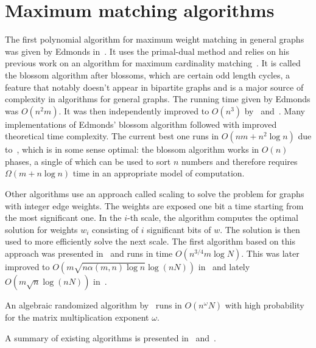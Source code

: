 \section{Maximum matching algorithms}

The first polynomial algorithm for maximum weight matching in general graphs was given by Edmonds in~\cite{edmonds1965maximum}. It uses the primal-dual method and relies on his previous work on an algorithm for maximum cardinality matching~\cite{edmonds1965paths}. It is called the blossom algorithm after blossoms, which are certain odd length cycles, a feature that notably doesn't appear in bipartite graphs and is a major source of complexity in algorithms for general graphs. The running time given by Edmonds was $O(n^2m)$. It was then independently improved to $O(n^3)$ by~\cite{lawler2001combinatorial} and~\cite{gabow1974implementation}. Many implementations of Edmonds' blossom algorithm followed with improved theoretical time complexity. The current best one runs in $O(nm + n^2 \log n)$ due to~\cite{gabow1990data}, which is in some sense optimal: the blossom algorithm works in $O(n)$ phases, a single of which can be used to sort $n$ numbers and therefore requires $\Omega(m + n \log n)$ time in an appropriate model of computation. 

Other algorithms use an approach called scaling to solve the problem for graphs with integer edge weights. The weights are exposed one bit a time starting from the most significant one. In the $i$-th scale, the algorithm computes the optimal solution for weights $w_i$ consisting of $i$ significant bits of $w$. The solution is then used to more efficiently solve the next scale. The first algorithm based on this approach was presented in~\cite{gabow1984efficient} and runs in time $O(n^{3/4}m \log N)$. This was later improved to $O(m \sqrt{n\alpha(m, n) \log n} \log(nN))$ in~\cite{gabow1991faster} and lately $O(m \sqrt{n} \log(nN))$ in~\cite{duan2018scaling}. 

An algebraic randomized algorithm by~\cite{cygan2015algorithmic} runs in $O(n^\omega N)$ with high probability for the matrix multiplication exponent $\omega$.

A summary of existing algorithms is presented in~ and~.

